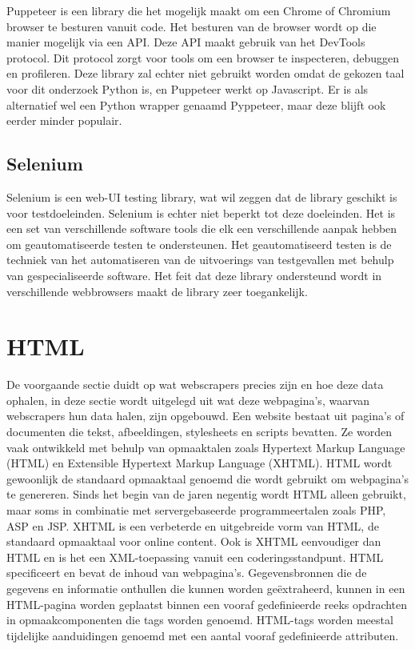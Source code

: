 Puppeteer is een library die het mogelijk maakt om een Chrome of Chromium browser te besturen vanuit code. Het besturen van de browser wordt op die manier mogelijk via een API. Deze API maakt gebruik van het DevTools protocol. Dit protocol zorgt voor tools om een browser te inspecteren, debuggen en profileren. Deze library zal echter niet gebruikt worden omdat de gekozen taal voor dit onderzoek Python is, en Puppeteer werkt op Javascript. Er is als alternatief wel een Python wrapper genaamd Pyppeteer, maar deze blijft ook eerder minder populair.

\subsection{Selenium}

Selenium is een web-UI testing library, wat wil zeggen dat de library geschikt is voor testdoeleinden. Selenium is echter niet beperkt tot deze doeleinden. Het is een set van verschillende software tools die elk een verschillende aanpak hebben om geautomatiseerde testen te ondersteunen. Het geautomatiseerd testen is de techniek van het automatiseren van de uitvoerings van testgevallen met behulp van gespecialiseerde software. Het feit dat deze library ondersteund wordt in verschillende webbrowsers maakt de library zeer toegankelijk.


\section{HTML}
De voorgaande sectie duidt op wat webscrapers precies zijn en hoe deze data ophalen, in deze sectie wordt uitgelegd uit wat deze webpagina's, waarvan webscrapers hun data halen, zijn opgebouwd.
Een website bestaat uit pagina's of documenten die tekst, afbeeldingen, stylesheets en scripts bevatten. Ze worden vaak ontwikkeld met behulp van opmaaktalen zoals Hypertext Markup Language (HTML) en Extensible Hypertext Markup Language (XHTML). HTML wordt gewoonlijk de standaard opmaaktaal genoemd die wordt gebruikt om webpagina's te genereren. Sinds het begin van de jaren negentig wordt HTML alleen gebruikt, maar soms in combinatie met servergebaseerde programmeertalen zoals PHP, ASP en JSP.  XHTML is een verbeterde en uitgebreide vorm van HTML, de standaard opmaaktaal voor online content. Ook is XHTML eenvoudiger dan HTML en is het een XML-toepassing vanuit een coderingsstandpunt. HTML specificeert en bevat de inhoud van webpagina's. Gegevensbronnen die de gegevens en informatie onthullen die kunnen worden geëxtraheerd,  kunnen in een HTML-pagina worden geplaatst binnen een vooraf gedefinieerde reeks opdrachten in opmaakcomponenten die tags worden genoemd. HTML-tags worden meestal tijdelijke aanduidingen genoemd met een aantal vooraf gedefinieerde attributen.

